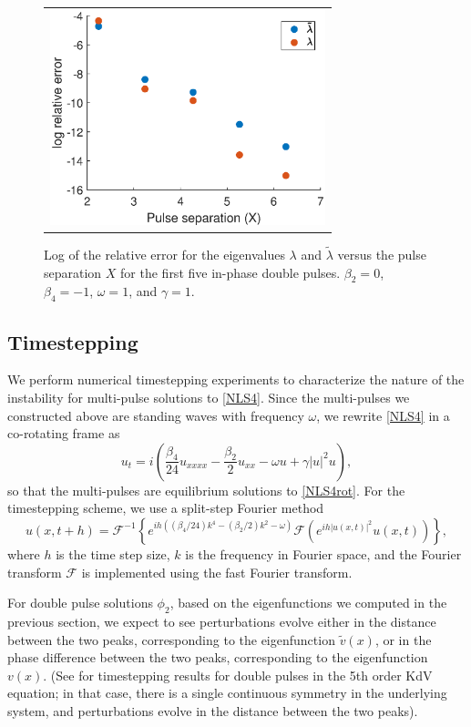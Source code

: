 \documentclass[12pt]{elsarticle}
\def\calF{{\mathcal F}}
\begin{document}
\begin{figure}[H]
\centering
\begin{tabular}{c}
\includegraphics[width=8cm]{images/inteigpred.eps}
\end{tabular}
\caption{Log of the relative error for the eigenvalues $\lambda$ and $\tilde{\lambda}$ versus the pulse separation $X$ for the first five in-phase double pulses. $\beta_2 = 0$, $\beta_4 = -1$, $\omega = 1$, and $\gamma = 1$.}
\label{fig:inteigpred}
\end{figure}

\subsection{Timestepping}

We perform numerical timestepping experiments to characterize the nature of the instability for multi-pulse solutions to \cref{NLS4}. Since the multi-pulses we constructed above are standing waves with frequency $\omega$, we rewrite \cref{NLS4} in a co-rotating frame as 
\begin{equation}\label{NLS4rot}
u_t = i\left( \frac{\beta_4}{24}u_{xxxx} - \frac{\beta_2}{2}u_{xx} - \omega u + \gamma |u|^2 u \right),
\end{equation}
so that the multi-pulses are equilibrium solutions to \cref{NLS4rot}. For the timestepping scheme, we use a split-step Fourier method \cite{Agrawal2013,Bogomolov2006} 
\begin{equation}\label{eq:splitstep}
u(x,t+h) = \calF^{-1} \left\{  e^{i h \left( (\beta_4/24) k^4 - (\beta_2/2)k^2 - \omega \right) } \calF\left( e^{ih |u(x,t)|^2} u(x,t) \right) \right\},
\end{equation}
where $h$ is the time step size, $k$ is the frequency in Fourier space, and the Fourier transform $\calF$ is implemented using the fast Fourier transform.

For double pulse solutions $\phi_2$, based on the eigenfunctions we computed in the previous section, we expect to see perturbations evolve either in the distance between the two peaks, corresponding to the eigenfunction $\tilde{v}(x)$, or in the phase difference between the two peaks, corresponding to the eigenfunction $v(x)$. (See \cite[Figure 9]{Pelinovsky2007} for timestepping results for double pulses in the 5th order KdV equation; in that case, there is a single continuous symmetry in the underlying system, and perturbations evolve in the distance between the two peaks).
\end{document}
